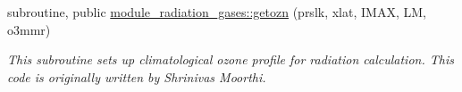 \begin{DoxyCompactItemize}
subroutine, public \hyperlink{group__module__radiation__gases_ga91f9dd83a3832ad2615efb06b52eee92}{module\+\_\+radiation\+\_\+gases\+::getozn} (prslk, xlat, I\+M\+AX, LM, o3mmr)
\begin{DoxyCompactList}\small\item\em This subroutine sets up climatological ozone profile for radiation calculation. This code is originally written by Shrinivas Moorthi. \end{DoxyCompactList}\end{DoxyCompactItemize}
